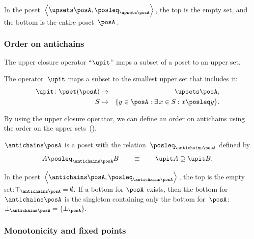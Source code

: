 In the poset~$\left\langle \upsets\posA,\posleq_{\upsets\posA}\right\rangle $,
the top is the empty set, and the bottom is the entire poset~$\posA$.


\subsubsection*{Order on antichains}

The upper closure operator ``$\upit$'' maps a subset of a poset
to an upper set.
\begin{defn}
The operator~$\upit$ maps a subset to the smallest upper set that
includes it: 
\begin{eqnarray*}
\upit\colon\pset(\posA) & \rightarrow & \upsets\posA,\\
S & \mapsto & \{y\in\posA:\exists\,x\in S:x\posleq y\}.
\end{eqnarray*}
\end{defn}


By using the upper closure operator, we can define an order on antichains
using the order on the upper sets~().
\begin{lem}
\label{lem:antichains-are-poset}$\antichains\posA$ is a poset with
the relation~$\posleq_{\antichains\posA}$ defined by
\[
A\posleq_{\antichains\posA}B\qquad\equiv\qquad\upit A\supseteq\upit B.
\]
\end{lem}
In the poset $\left\langle \antichains\posA,\posleq_{\antichains\posA}\right\rangle $,
the top is the empty set:$\top_{\antichains\posA}=\emptyset.$ If
a bottom for $\posA$ exists, then the bottom for~$\antichains\posA$
is the singleton containing only the bottom for~$\posA$: $\bot_{\antichains\posA}=\{\bot_{\posA}\}.$


\subsubsection*{Monotonicity and fixed points\label{sec:Monotonicity-and-fixed}}

